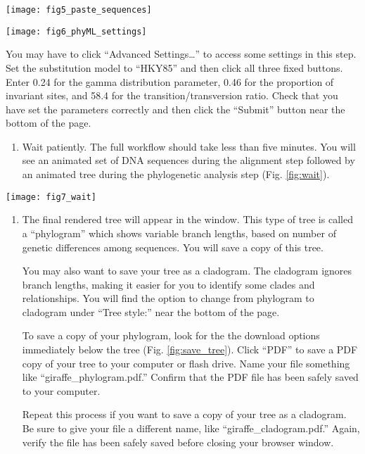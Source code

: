 \documentclass[11pt, addpoints]{exam}
\begin{document}
\newpage

\begin{center}
	\texttt{[image: fig5\_paste\_sequences]}
\end{center}

\vfill

\begin{center}
	\texttt{[image: fig6\_phyML\_settings]}
\end{center}

\noindent You may have to click “Advanced Settings\dots” to access 
some settings in this step. Set the substitution model to ``HKY85'' and then click all three
fixed buttons. Enter 0.24 for the gamma distribution parameter, 0.46 for
the proportion of invariant sites, and 58.4 for the
transition/transversion ratio. Check that you have set the parameters
correctly and then click the ``Submit'' button near the bottom of the
page.

\begin{enumerate}
\item
  Wait patiently. The full workflow should take less than five minutes.
  You will see an animated set of DNA sequences during the alignment
  step followed by an animated tree during the phylogenetic analysis
  step (Fig. \ref{fig:wait}).
\end{enumerate}

\begin{center}
	\texttt{[image: fig7\_wait]}
\end{center}

\begin{enumerate}
\item
  The final rendered tree will appear in the window. This type of tree is called
  a “phylogram” which shows variable branch lengths, based on number of 
  genetic differences among sequences. You will save a copy of this tree.
  
  You may also want to save your tree as a cladogram. The cladogram ignores
  branch lengths, making it easier for you to identify some clades and relationships.
  You will find the option to change from phylogram to cladogram under “Tree style:”
  near the bottom of the page.
  
  To save a copy of your phylogram, look for the the download options immediately 
  below the tree (Fig. \ref{fig:save_tree}). Click “PDF” to
  save a PDF copy of your tree to your computer or flash drive. Name your file something
  like “giraffe\_phylogram.pdf.” Confirm that the PDF file has been safely saved to your 
  computer.
  
  Repeat this process if you want to save a copy of your tree as a cladogram. Be sure to
  give your file a different name, like “giraffe\_cladogram.pdf.” Again, verify the file has
  been safely saved before closing your browser window.
  
\end{enumerate}
\end{document}
